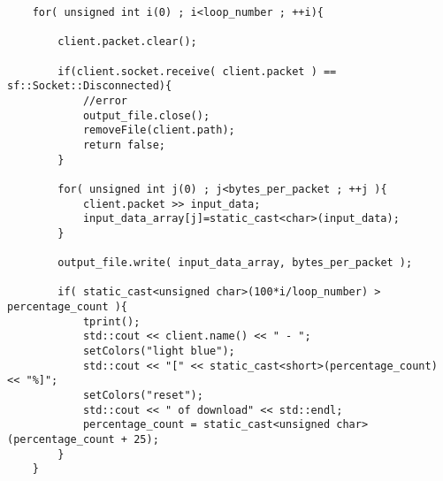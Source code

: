 \begin{lstlisting}
    for( unsigned int i(0) ; i<loop_number ; ++i){
        
        client.packet.clear();

        if(client.socket.receive( client.packet ) == sf::Socket::Disconnected){
            //error
            output_file.close();
            removeFile(client.path);
            return false;
        }

        for( unsigned int j(0) ; j<bytes_per_packet ; ++j ){
            client.packet >> input_data;
            input_data_array[j]=static_cast<char>(input_data);
        }

        output_file.write( input_data_array, bytes_per_packet );

        if( static_cast<unsigned char>(100*i/loop_number) > percentage_count ){
            tprint();
            std::cout << client.name() << " - ";
            setColors("light blue");
            std::cout << "[" << static_cast<short>(percentage_count) << "%]";
            setColors("reset");
            std::cout << " of download" << std::endl;
            percentage_count = static_cast<unsigned char>(percentage_count + 25);
        }
    }
\end{lstlisting}